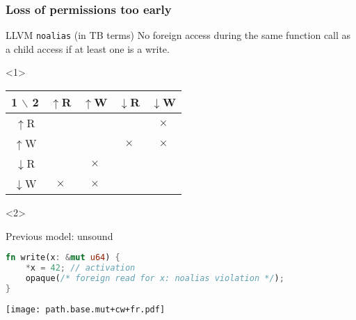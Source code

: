 \begin{frame}[fragile, t]
    \frametitle{Loss of permissions too early}
    \begin{alertblock}{LLVM \texttt{noalias} (in TB terms)}
        No foreign access during the same function call as a child access
        if at least one is a write.
    \end{alertblock}
    
    \begin{onlyenv}<1>
        \begin{center}
        \begin{tabular}{|c|c|c|c|c|}
            \hline
            1 \(\backslash\) 2 & \(\uparrow\)R & \(\uparrow\)W & \(\downarrow\)R & \(\downarrow\)W \\
            \hline
            \(\uparrow\)R &  &  &  & \(\times\) \\
            \hline
            \(\uparrow\)W &  &  & \(\times\) & \(\times\) \\
            \hline
            \(\downarrow\)R &  & \(\times\) &  &  \\
            \hline
            \(\downarrow\)W & \(\times\) & \(\times\) &  &  \\
            \hline
        \end{tabular}
        \end{center}
    \end{onlyenv}

    \begin{onlyenv}<2>
        \begin{block}{Previous model: unsound}
            \begin{lstlisting}[language=rust, escapechar=@]
fn write(x: &mut u64) {
    *x = 42; // activation
    opaque(/* foreign read for x: noalias violation */);
}
            \end{lstlisting}
        \end{block}
        \texttt{[image: path.base.mut+cw+fr.pdf]}
    \end{onlyenv}
\end{frame}

